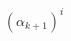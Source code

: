 \documentclass[preview]{standalone}
\begin{document}
\begin{align*}
( \alpha _{k+1})^{i}
\end{align*}
\end{document}
